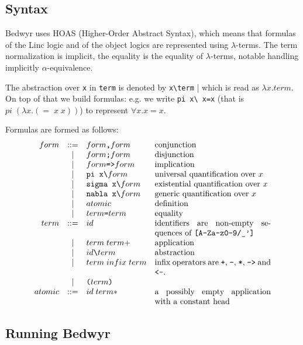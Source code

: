 \documentclass{article}
\begin{document}
\subsection{Syntax}

Bedwyr uses HOAS (Higher-Order Abstract Syntax), which means that formulas
of the Linc logic and of the object logics are represented using 
$\lambda$-terms. The term normalization is implicit, the equality is the 
equality of $\lambda$-terms, notable handling implicitly $\alpha$-equivalence.

The abstraction over \verb.x. in \verb.term. is denoted by \verb.x\term. | 
which is read as $\lambda x. term$. On top of that we build 
formulas: e.g. we write \verb.pi x\ x=x.
(that is $pi\;(\lambda{}x.(=\;x\;x))$)
to represent $\forall x. x=x$.

Formulas are formed as follows:
\[\begin{array}{rclp{5cm}}
form &::=& form \texttt{,}  form & conjunction \\
     & | & form \texttt{;}  form & disjunction \\
     & | & form \texttt{=>} form & implication \\
     & | & \verb.pi x\.    form  & universal quantification over $x$ \\
     & | & \verb.sigma x\. form  & existential quantification over $x$ \\
     & | & \verb.nabla x\. form  & generic quantification over $x$ \\
     & | & atomic & definition \\
     & | & term \verb.=. term & equality \\
term &::=& id & identifiers are non-empty sequences of \verb.[A-Za-z0-9/_']. \\
     & | & term \; term+ & application \\
     & | & id \verb.\. term & abstraction \\
     & | & term \; infix \; term & infix operators are
             \verb.+., \verb.-., \verb.*., \verb.->. and \verb.<-.. \\
     & | & \verb.(. term \verb.). & \\
atomic &::=& id \; term* & a possibly empty application with a constant head \\
\end{array}\]

\subsection{Running Bedwyr}
\end{document}
